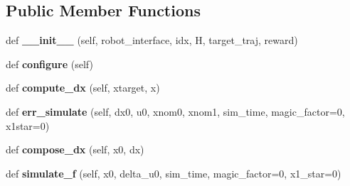 \subsection*{Public Member Functions}
\begin{DoxyCompactItemize}
\item 
\hypertarget{classaml__lfd_1_1lqr_1_1ddp__traj__follow__base_1_1_d_d_p_traj_follow_a3de96f0bfb74a5e25d4480a98cc52e01}{}\label{classaml__lfd_1_1lqr_1_1ddp__traj__follow__base_1_1_d_d_p_traj_follow_a3de96f0bfb74a5e25d4480a98cc52e01} 
def {\bfseries \+\_\+\+\_\+init\+\_\+\+\_\+} (self, robot\+\_\+interface, idx, H, target\+\_\+traj, reward)
\item 
\hypertarget{classaml__lfd_1_1lqr_1_1ddp__traj__follow__base_1_1_d_d_p_traj_follow_a59b2df263f660a988baacf2480d3f532}{}\label{classaml__lfd_1_1lqr_1_1ddp__traj__follow__base_1_1_d_d_p_traj_follow_a59b2df263f660a988baacf2480d3f532} 
def {\bfseries configure} (self)
\item 
\hypertarget{classaml__lfd_1_1lqr_1_1ddp__traj__follow__base_1_1_d_d_p_traj_follow_a948bcd5c5ce36cba1bd5b3ecaba22df4}{}\label{classaml__lfd_1_1lqr_1_1ddp__traj__follow__base_1_1_d_d_p_traj_follow_a948bcd5c5ce36cba1bd5b3ecaba22df4} 
def {\bfseries compute\+\_\+dx} (self, xtarget, x)
\item 
\hypertarget{classaml__lfd_1_1lqr_1_1ddp__traj__follow__base_1_1_d_d_p_traj_follow_a80a23176e5afd98d020249708be47571}{}\label{classaml__lfd_1_1lqr_1_1ddp__traj__follow__base_1_1_d_d_p_traj_follow_a80a23176e5afd98d020249708be47571} 
def {\bfseries err\+\_\+simulate} (self, dx0, u0, xnom0, xnom1, sim\+\_\+time, magic\+\_\+factor=0, x1star=0)
\item 
\hypertarget{classaml__lfd_1_1lqr_1_1ddp__traj__follow__base_1_1_d_d_p_traj_follow_a4a098a901151a3e0d17665ecc7578e41}{}\label{classaml__lfd_1_1lqr_1_1ddp__traj__follow__base_1_1_d_d_p_traj_follow_a4a098a901151a3e0d17665ecc7578e41} 
def {\bfseries compose\+\_\+dx} (self, x0, dx)
\item 
\hypertarget{classaml__lfd_1_1lqr_1_1ddp__traj__follow__base_1_1_d_d_p_traj_follow_a365a2a2035c47c8fc6db9a76ab8b7287}{}\label{classaml__lfd_1_1lqr_1_1ddp__traj__follow__base_1_1_d_d_p_traj_follow_a365a2a2035c47c8fc6db9a76ab8b7287} 
def {\bfseries simulate\+\_\+f} (self, x0, delta\+\_\+u0, sim\+\_\+time, magic\+\_\+factor=0, x1\+\_\+star=0)
\item 
\hypertarget{classaml__lfd_1_1lqr_1_1ddp__traj__follow__base_1_1_d_d_p_traj_follow_a80762be747063c04ce78f9f082bfd9bd}{}\label{classaml__lfd_1_1lqr_1_1ddp__traj__follow__base_1_1_d_d_p_traj_follow_a80762be747063c04ce78f9f082bfd9bd} 

\end{DoxyCompactItemize}

